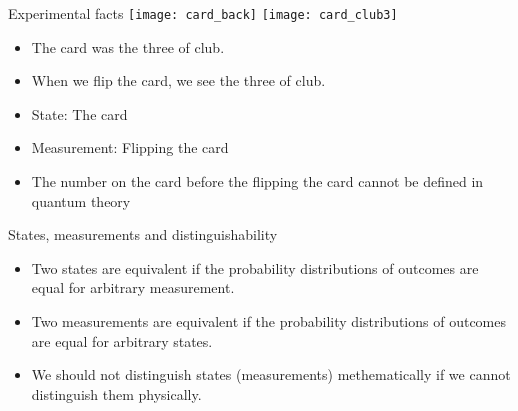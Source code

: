 \documentclass{beamer}
\newcommand{\cmark}{\ding{51}}%
\newcommand{\xmark}{\ding{55}}%
\newcommand\emm[1]{\textcolor{redorange}{{#1}}}
\theoremstyle{definition}
\begin{document}
\begin{frame}{Experimental facts}
\texttt{[image: card\_back]}
\hfill
\texttt{[image: card\_club3]}

\vspace{1em}
\begin{itemize}
\item \textcolor{red}{\xmark}\; The card was the three of club.
\item \textcolor{green}{\cmark}\; When we flip the card, we see the three of club.
\end{itemize}
\begin{itemize}
\item State: The card
\item Measurement: Flipping the card
\item The number on the card before the flipping the card \emm{cannot be defined} in quantum theory
\end{itemize}
\end{frame}

\begin{frame}{States, measurements and distinguishability}
\begin{itemize}
\setlength{\itemsep}{2em}
\item Two states are equivalent if the probability distributions of outcomes are equal for \emm{arbitrary measurement}.
\item Two measurements are equivalent if the probability distributions of outcomes are equal for \emm{arbitrary states}.
\item \emm{We should not distinguish states (measurements) methematically if we cannot distinguish them physically}.
\end{itemize}
\end{frame}
\end{document}

